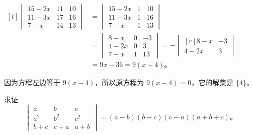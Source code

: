 \jie $\begin{aligned}[t]
    \begin{vmatrix}
        15 - 2x & 11 & 10 \\
        11 - 3x & 17 & 16 \\
        7 - x   & 14 & 13
    \end{vmatrix}
    &=  \begin{vmatrix}
            15 - 2x & 1 & 10 \\
            11 - 3x & 1 & 16 \\
            7 - x   & 1 & 13
        \end{vmatrix} \\
    &=  \begin{vmatrix}
            8 - x  & 0 & -3 \\
            4 - 2x & 0 & 3 \\
            7 - x  & 1 & 13
        \end{vmatrix}
    =  -\begin{vmatrix*}[r]
            8 - x  & -3 \\
            4 - 2x & 3
        \end{vmatrix*} \\
    &= 9x - 36 = 9(x - 4) \text{。}
\end{aligned}$

因为方程左边等于 $9(x - 4)$，所以原方程为 $9(x - 4) = 0$，它的解集是 $\{ 4  \}$。



\liti 求证
$$
\begin{vmatrix}
    a     & b     & c \\
    a^2   & b^2   & c^2 \\
    b + c & c + a & a + b
\end{vmatrix} = (a - b)(b - c)(c - a)(a + b + c) \text{。}
$$


